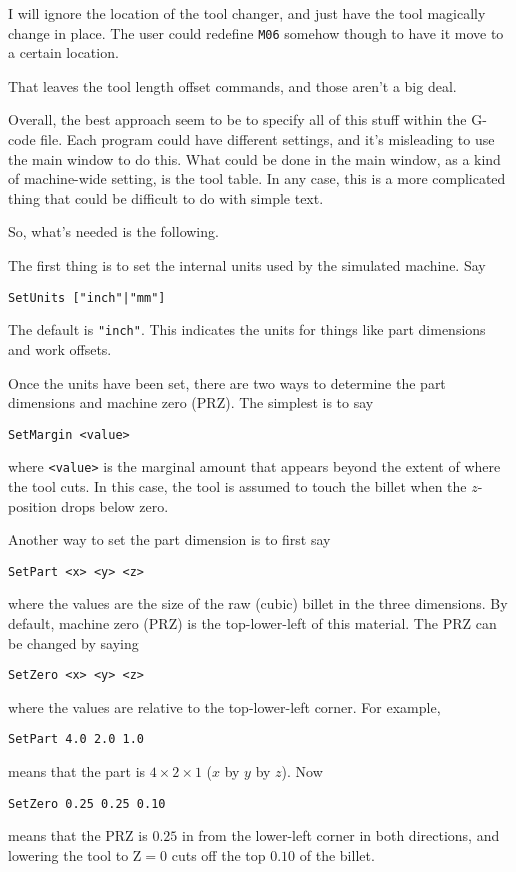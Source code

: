 \documentclass[titlepage,oneside,10pt]{article}
\begin{document}
I will ignore the location of the tool changer, and just have the tool
magically change in place. The user could redefine {\tt M06} somehow
though to have it move to a certain location.

That leaves the tool length offset commands, and those aren't a big
deal.

Overall, the best approach seem to be to specify all of this stuff
within the G-code file. Each program could have different settings,
and it's misleading to use the main window to do this. What could be
done in the main window, as a kind of machine-wide setting, is the
tool table. In any case, this is a more complicated thing that could
be difficult to do with simple text.

So, what's needed is the following.

The first thing is to set the internal units used by the simulated
machine. Say
\begin{verbatim}
SetUnits ["inch"|"mm"]
\end{verbatim}
The default is {\tt "inch"}. This indicates the units for things like
part dimensions and work offsets.

Once the units have been set, there are two ways to determine the part
dimensions and machine zero (PRZ). The simplest is to say
\begin{verbatim}
SetMargin <value>
\end{verbatim}
where {\tt <value>} is the marginal amount that appears beyond the
extent of where the tool cuts. In this case, the tool is assumed to
touch the billet when the $z$-position drops below zero.

Another way to set the part dimension is to first say
\begin{verbatim}
SetPart <x> <y> <z>
\end{verbatim}
where the values are the size of the raw (cubic) billet in the three
dimensions. By default, machine zero (PRZ) is the top-lower-left of
this material. The PRZ can be changed by saying
\begin{verbatim}
SetZero <x> <y> <z>
\end{verbatim}
where the values are relative to the top-lower-left corner. For example,
\begin{verbatim}
SetPart 4.0 2.0 1.0
\end{verbatim}
means that the part is $4\times2\times1$ ($x$ by $y$ by $z$). Now 
\begin{verbatim}
SetZero 0.25 0.25 0.10
\end{verbatim}
means that the PRZ is $0.25$ in from the lower-left corner in both
directions, and lowering the tool to Z$=0$ cuts off the top $0.10$ of
the billet. 
\end{document}
